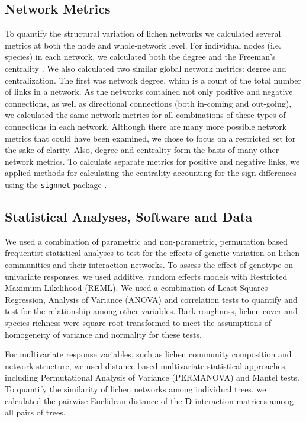 \documentclass[11pt,twocolumn,twoside,lineno]{pnas-new}
\begin{document}
{\subsection*{Network Metrics}

To quantify the structural variation of lichen networks we calculated
several metrics at both the node and whole-network level. For
individual nodes (i.e. species) in each network, we calculated both
the degree and the Freeman's centrality \cite{sna}. We also calculated
two similar global network metrics: degree and centralization. The
first was network degree, which is a count of the total number of
links in a network. As the networks contained not only positive and
negative connections, as well as directional connections (both
in-coming and out-going), we calculated the same network metrics for
all combinations of these types of connections in each
network. Although there are many more possible network metrics that
could have been examined, we chose to focus on a restricted set for
the sake of clarity. Also, degree and centrality form the basis of
many other network metrics. To calculate separate metrics for positive
and negative links, we applied methods for calculating the centrality
accounting for the sign differences \cite{Everett2014NetworksTies}
using the \texttt{signnet} package \cite{siggnet}.


\subsection*{Statistical Analyses, Software and Data}

We used a combination of parametric and non-parametric, permutation
based frequentist statistical analyses to test for the effects of
genetic variation on lichen communities and their interaction
networks. To assess the effect of genotype on univariate responses, we
used additive, random effects models with Restricted Maximum
Likelihood (REML). We used a combination of Least Squares Regression,
Analysis of Variance (ANOVA) and correlation tests to quantify and
test for the relationship among other variables. Bark roughness,
lichen cover and species richness were square-root transformed to meet
the assumptions of homogeneity of variance and normality for these
tests.

For multivariate response variables, such as lichen community
composition and network structure, we used distance based multivariate
statistical approaches, including Permutational Analysis of Variance
(PERMANOVA) and Mantel tests. To quantify the similarity of lichen
networks among individual trees, we calculated the pairwise Euclidean
distance of the $\mathbf{D}$ interaction matrices among all pairs of
trees.

}
\end{document}

